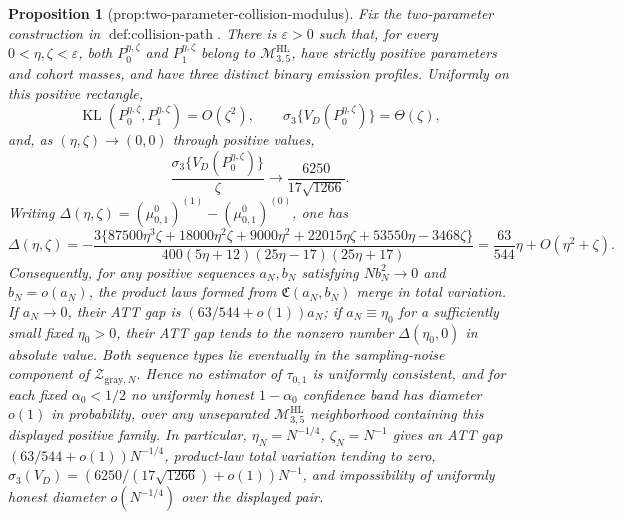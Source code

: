 \documentclass{article}
\newtheorem{proposition}{Proposition}
\begin{document}
\begin{proposition}[prop:two-parameter-collision-modulus]\label{prop:two-parameter-collision-modulus}
Fix the two-parameter construction in \(\operatorname{def:collision\text{-}path}\). There is \(\varepsilon>0\) such that, for every \(0<\eta,\zeta<\varepsilon\), both \(P_0^{\eta,\zeta}\) and \(P_1^{\eta,\zeta}\) belong to \(\mathcal M^{\mathrm{HL}}_{3,5}\), have strictly positive parameters and cohort masses, and have three distinct binary emission profiles. Uniformly on this positive rectangle,
\[
 \operatorname{KL}(P_0^{\eta,\zeta},P_1^{\eta,\zeta})=O(\zeta^2),
 \qquad
 \sigma_3\{V_D(P_0^{\eta,\zeta})\}=\Theta(\zeta),
\]
and, as \((\eta,\zeta)\to(0,0)\) through positive values,
\[
 \frac{\sigma_3\{V_D(P_0^{\eta,\zeta})\}}{\zeta}
 \longrightarrow \frac{6250}{17\sqrt{1266}}.
\]
Writing \(\Delta(\eta,\zeta)=(\mu^0_{0,1})^{(1)}-(\mu^0_{0,1})^{(0)}\), one has
\[
 \Delta(\eta,\zeta)
 =-\frac{3\{87500\eta^3\zeta+18000\eta^2\zeta+9000\eta^2+22015\eta\zeta+53550\eta-3468\zeta\}}
 {400(5\eta+12)(25\eta-17)(25\eta+17)}
 =\frac{63}{544}\eta+O(\eta^2+\zeta).
\]
Consequently, for any positive sequences \(a_N,b_N\) satisfying \(Nb_N^2\to0\) and \(b_N=o(a_N)\), the product laws formed from \(\mathfrak C(a_N,b_N)\) merge in total variation. If \(a_N\to0\), their ATT gap is \((63/544+o(1))a_N\); if \(a_N\equiv\eta_0\) for a sufficiently small fixed \(\eta_0>0\), their ATT gap tends to the nonzero number \(\Delta(\eta_0,0)\) in absolute value. Both sequence types lie eventually in the sampling-noise component of \(\mathcal Z_{\mathrm{gray},N}\). Hence no estimator of \(\tau_{0,1}\) is uniformly consistent, and for each fixed \(\alpha_0<1/2\) no uniformly honest \(1-\alpha_0\) confidence band has diameter \(o(1)\) in probability, over any unseparated \(\mathcal M^{\mathrm{HL}}_{3,5}\) neighborhood containing this displayed positive family. In particular, \(\eta_N=N^{-1/4}\), \(\zeta_N=N^{-1}\) gives an ATT gap \((63/544+o(1))N^{-1/4}\), product-law total variation tending to zero, \(\sigma_3(V_D)=(6250/(17\sqrt{1266})+o(1))N^{-1}\), and impossibility of uniformly honest diameter \(o(N^{-1/4})\) over the displayed pair.
\end{proposition}
\end{document}
